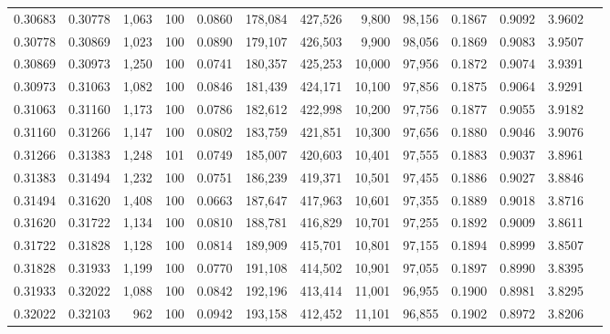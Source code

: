 \begin{tabular}{rrrrrrrrrrrrr}
0.30683 & 0.30778 & 1,063 & 100 &                                     0.0860 & 178,084 & 427,526 &   9,800 &  98,156 & 0.1867 & 0.9092 & 3.9602 \\
0.30778 & 0.30869 & 1,023 & 100 &                                     0.0890 & 179,107 & 426,503 &   9,900 &  98,056 & 0.1869 & 0.9083 & 3.9507 \\
0.30869 & 0.30973 & 1,250 & 100 &                                     0.0741 & 180,357 & 425,253 &  10,000 &  97,956 & 0.1872 & 0.9074 & 3.9391 \\
0.30973 & 0.31063 & 1,082 & 100 &                                     0.0846 & 181,439 & 424,171 &  10,100 &  97,856 & 0.1875 & 0.9064 & 3.9291 \\
0.31063 & 0.31160 & 1,173 & 100 &                                     0.0786 & 182,612 & 422,998 &  10,200 &  97,756 & 0.1877 & 0.9055 & 3.9182 \\
0.31160 & 0.31266 & 1,147 & 100 &                                     0.0802 & 183,759 & 421,851 &  10,300 &  97,656 & 0.1880 & 0.9046 & 3.9076 \\
0.31266 & 0.31383 & 1,248 & 101 &                                     0.0749 & 185,007 & 420,603 &  10,401 &  97,555 & 0.1883 & 0.9037 & 3.8961 \\
0.31383 & 0.31494 & 1,232 & 100 &                                     0.0751 & 186,239 & 419,371 &  10,501 &  97,455 & 0.1886 & 0.9027 & 3.8846 \\
0.31494 & 0.31620 & 1,408 & 100 &                                     0.0663 & 187,647 & 417,963 &  10,601 &  97,355 & 0.1889 & 0.9018 & 3.8716 \\
0.31620 & 0.31722 & 1,134 & 100 &                                     0.0810 & 188,781 & 416,829 &  10,701 &  97,255 & 0.1892 & 0.9009 & 3.8611 \\
0.31722 & 0.31828 & 1,128 & 100 &                                     0.0814 & 189,909 & 415,701 &  10,801 &  97,155 & 0.1894 & 0.8999 & 3.8507 \\
0.31828 & 0.31933 & 1,199 & 100 &                                     0.0770 & 191,108 & 414,502 &  10,901 &  97,055 & 0.1897 & 0.8990 & 3.8395 \\
0.31933 & 0.32022 & 1,088 & 100 &                                     0.0842 & 192,196 & 413,414 &  11,001 &  96,955 & 0.1900 & 0.8981 & 3.8295 \\
0.32022 & 0.32103 &   962 & 100 &                                     0.0942 & 193,158 & 412,452 &  11,101 &  96,855 & 0.1902 & 0.8972 & 3.8206 \\

\end{tabular}
